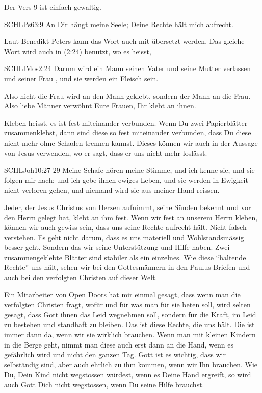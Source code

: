 \documentclass[14pt]{mybib}
\begin{document}
    \begin{otsblock}
        Der Vers 9 ist einfach gewaltig.
        \begin{bibelbox}{SCHL}{Ps}{63:9}
            An Dir hängt meine Seele; Deine Rechte hält mich aufrecht.
        \end{bibelbox}
        Laut Benedikt Peters kann das Wort  auch mit  übersetzt werden. Das gleiche Wort wird auch in  (2:24) benutzt, wo es heisst, 
        \begin{bibelbox}{SCHL}{IMos}{2:24}
            Darum wird ein Mann seinen Vater und seine Mutter verlassen und seiner Frau , und sie werden ein Fleisch sein.
        \end{bibelbox}
        Also nicht die Frau wird an den Mann geklebt, sondern der Mann an die Frau. Also liebe Männer verwöhnt Eure Frauen, Ihr klebt an ihnen.

        Kleben heisst, es ist fest miteinander verbunden. Wenn Du zwei Papierblätter zusammenklebst, dann sind diese so fest miteinander verbunden, dass Du diese nicht mehr ohne Schaden trennen kannst. Dieses  können wir auch in der Aussage von Jesus verwenden, wo er sagt, dass er uns nicht mehr loslässt. 
        \begin{bibelbox}{SCHL}{Joh}{10:27-29}
            Meine Schafe hören meine Stimme, und ich kenne sie, und sie folgen mir nach; und ich gebe ihnen ewiges Leben, und sie werden in Ewigkeit nicht verloren gehen, und niemand wird sie aus meiner Hand reissen.
        \end{bibelbox}
        Jeder, der Jesus Christus von Herzen aufnimmt, seine Sünden bekennt und vor den Herrn gelegt hat, klebt an ihm fest. Wenn wir fest an unserem Herrn kleben, können wir auch gewiss sein, dass uns seine Rechte aufrecht hält. Nicht falsch verstehen. Es geht nicht darum, dass es uns materiell und Wohlstandsmässig besser geht. Sondern das wir seine Unterstützung und Hilfe haben. Zwei zusammengeklebte Blätter sind stabiler als ein einzelnes. Wie diese \enquote{haltende Rechte} uns hält, sehen wir bei den Gottesmännern in den Paulus Briefen und auch bei den verfolgten Christen auf dieser Welt. 
        
        Ein Mitarbeiter von Open Doors hat mir einmal gesagt, dass wenn man die verfolgten Christen fragt, wofür und für was man für sie beten soll, wird selten gesagt, dass Gott ihnen das Leid wegnehmen soll, sondern für die Kraft, im Leid zu bestehen und standhaft zu bleiben. Das ist diese Rechte, die uns hält. Die ist immer dann da, wenn wir sie wirklich brauchen. Wenn man mit kleinen Kindern in die Berge geht, nimmt man diese auch erst dann an die Hand, wenn es gefährlich wird und nicht den ganzen Tag. Gott ist es wichtig, dass wir selbständig sind, aber auch ehrlich zu ihm kommen, wenn wir Ihn brauchen. Wie Du, Dein Kind nicht wegstossen würdest, wenn es Deine Hand ergreift, so wird auch Gott Dich nicht wegstossen, wenn Du seine Hilfe brauchst.
    \end{otsblock}
\end{document}
